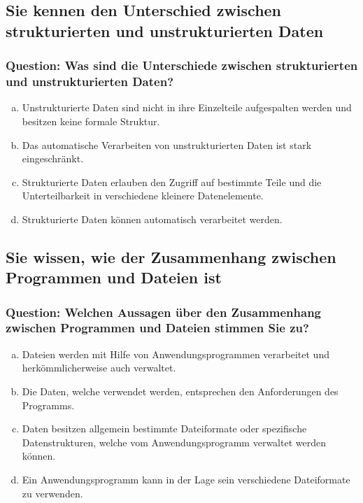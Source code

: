 \documentclass{article}
\begin{document}
\begin{adjustwidth}{2em}{2em}
\begin{adjustwidth}{2em}{2em}
			\subsection{Sie kennen den Unterschied zwischen strukturierten und unstrukturierten Daten}
			\begin{adjustwidth}{1em}{}
				\subsubsection*{Question: Was sind die Unterschiede zwischen strukturierten und unstrukturierten Daten?}
				\begin{adjustwidth}{1em}{}
					\begin{enumerate}[(a)]
						\item Unstrukturierte Daten sind nicht in ihre Einzelteile aufgespalten werden und besitzen keine formale Struktur.
						\item Das automatische Verarbeiten von unstrukturierten Daten ist stark eingeschränkt.
						\item Strukturierte Daten erlauben den Zugriff auf bestimmte Teile und die Unterteilbarkeit in verschiedene kleinere Datenelemente.
						\item Strukturierte Daten können automatisch verarbeitet werden.
					\end{enumerate}
				\end{adjustwidth}
			\end{adjustwidth}
			\subsection{Sie wissen, wie der Zusammenhang zwischen Programmen und Dateien ist}
			\begin{adjustwidth}{1em}{}
				\subsubsection*{Question: Welchen Aussagen über den Zusammenhang zwischen Programmen und Dateien stimmen Sie zu?}
				\begin{adjustwidth}{1em}{}
					\begin{enumerate}[(a)]
						\item Dateien werden mit Hilfe von Anwendungsprogrammen verarbeitet und herkömmlicherweise auch verwaltet.
						\item Die Daten, welche verwendet werden, entsprechen den Anforderungen des Programms. 
						\item Daten besitzen allgemein bestimmte Dateiformate oder spezifische Datenstrukturen, welche vom Anwendungsprogramm verwaltet werden können.
						\item Ein Anwendungsprogramm kann in der Lage sein verschiedene Dateiformate zu verwenden.
					\end{enumerate}
				\end{adjustwidth}
			\end{adjustwidth}

\end{adjustwidth}
\end{adjustwidth}
\end{document}
